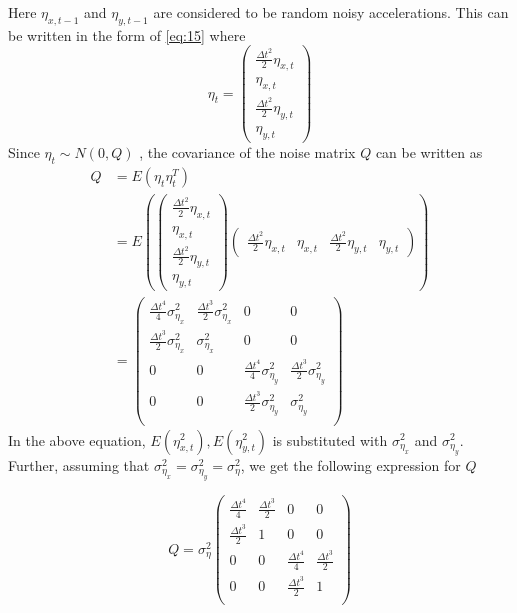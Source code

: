 \documentclass{article}
\begin{document}
Here $\eta_{x,t-1}$ and $\eta_{y,t-1}$ are considered to be random noisy accelerations. This can be written in the form of \ref{eq:15} where 
$$\eta_t=\begin{pmatrix}
\frac{\Delta t^2}{2}\eta_{x,t} \\
\eta_{x,t} \\
\frac{\Delta t^2}{2}\eta_{y,t}\\
\eta_{y,t}
\end{pmatrix}$$
Since $\eta_t \sim N(0,Q)$ , the covariance of the noise matrix $Q$ can be written as 
\begin{equation}\label{eq:17}
\begin{aligned}
    Q&=E(\eta_t \eta_t^T)\\
    &= E(\begin{pmatrix}
\frac{\Delta t^2}{2}\eta_{x,t} \\
\eta_{x,t} \\
\frac{\Delta t^2}{2}\eta_{y,t}\\
\eta_{y,t}
\end{pmatrix}\begin{pmatrix}\frac{\Delta t^2}{2}\eta_{x,t} & 
\eta_{x,t} &
\frac{\Delta t^2}{2}\eta_{y,t} &
\eta_{y,t}
\end{pmatrix})\\
&=\begin{pmatrix}\frac{\Delta t^4}{4} \sigma_{\eta_x}^2&
\frac{\Delta t^3}{2}\sigma_{\eta_x}^2 & 0 & 0 \\
\frac{\Delta t^3}{2}\sigma_{\eta_x}^2 & \sigma_{\eta_x}^2 & 0 & 0 \\
 0 & 0 & \frac{\Delta t^4}{4} \sigma_{\eta_y}^2 & \frac{\Delta t^3}{2}\sigma_{\eta_y}^2\\
 0 & 0 & \frac{\Delta t^3}{2}\sigma_{\eta_y}^2 & \sigma_{\eta_y}^2 \\
\end{pmatrix}
\end{aligned}
\end{equation}
In the above equation, $E(\eta_{x,t}^2), E(\eta_{y,t}^2)$ is substituted with $\sigma_{\eta_x}^2$ and $\sigma_{\eta_y}^2$. Further, assuming that $\sigma_{\eta_x}^2=\sigma_{\eta_y}^2=\sigma_{\eta}^2$, we get the following expression for $Q$

\begin{equation}\label{eq:18}
    Q=\sigma_\eta^2\begin{pmatrix}
    \frac{\Delta t^4}{4} & \frac{\Delta t^3}{2} & 0 & 0\\
    \frac{\Delta t^3}{2} & 1 & 0 & 0\\
    0 & 0 & \frac{\Delta t^4}{4} & \frac{\Delta t^3}{2} \\
    0 & 0 & \frac{\Delta t^3}{2} & 1 \\
    \end{pmatrix}
\end{equation}
\end{document}
